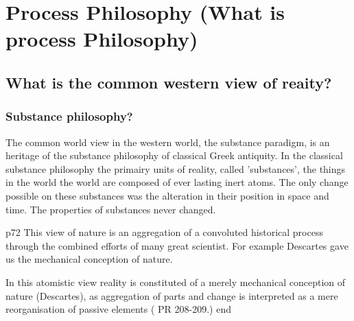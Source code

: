 
\chapter{Process Philosophy (What is process Philosophy)}




\section{What is the common western view of reaity?}

\subsection{Substance philosophy?}
The common world view in the western world, the substance paradigm, is an heritage of the substance philosophy of classical Greek antiquity.
In the classical substance philosophy the primairy units of reality, called 'substances', the things in the world the world are composed of ever lasting inert atoms. The only change possible on these substances was the alteration in their position in space and time. The properties of substances never changed.
\cite{rescher1996process,rescher-2012-sep,seibt-2013-sep}


\cite[ch 5]{rapp1990whitehead}
p72
This view of nature is an aggregation of a convoluted historical process through the combined efforts of many great scientist. For example Descartes gave us the mechanical conception of nature.

In this atomistic view reality is constituted of a merely mechanical conception of nature (Descartes), as  aggregation of parts and change is interpreted as a mere reorganisation of passive elements ( PR 208-209.)
end



